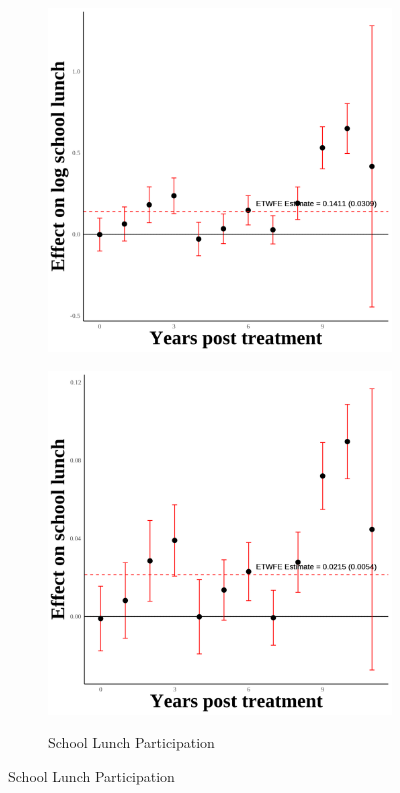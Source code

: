 \documentclass[12pt,english]{article}
\begin{document}
\begin{figure}[H]
\begin{subfigure}[b]{0.3\textwidth}
    \includegraphics[width=\linewidth]{figures/plot90-ln_schl_lunch_event_study-fourth.png}
    \label{fig:ln-schl-lunch-fourth}
  \end{subfigure}
  \hfill
  \begin{subfigure}[b]{0.3\textwidth}
    \centering
    \caption{School Lunch Participation}
    \includegraphics[width=\linewidth]{figures/plot91-schl_lunch_event_study-fourth.png}
    \label{fig:schl-lunch-fourth}
  \end{subfigure}


\end{figure}
\end{document}
